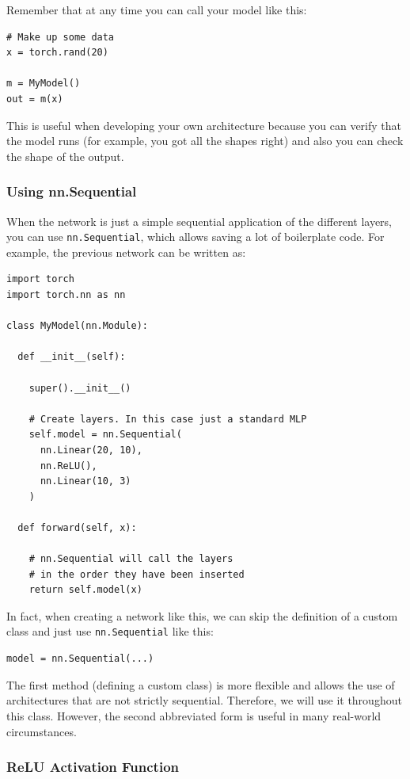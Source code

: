 Remember that at any time you can call your model like this:
\begin{lstlisting}
# Make up some data
x = torch.rand(20)

m = MyModel()
out = m(x)
\end{lstlisting}

This is useful when developing your own architecture because you can verify that the model runs (for example, you got all the shapes right) and also you can check the shape of the output.

\subsubsection{Using nn.Sequential}

When the network is just a simple sequential application of the different layers, you can use \verb|nn.Sequential|, which allows saving a lot of boilerplate code. For example, the previous network can be written as:

\begin{lstlisting}
import torch
import torch.nn as nn

class MyModel(nn.Module):

  def __init__(self):

    super().__init__()

    # Create layers. In this case just a standard MLP
    self.model = nn.Sequential(
      nn.Linear(20, 10),
      nn.ReLU(),
      nn.Linear(10, 3)
    )

  def forward(self, x):

    # nn.Sequential will call the layers 
    # in the order they have been inserted
    return self.model(x)
\end{lstlisting}

In fact, when creating a network like this, we can skip the definition of a custom class and just use \verb|nn.Sequential| like this:

\begin{lstlisting}
model = nn.Sequential(...)
\end{lstlisting}
The first method (defining a custom class) is more flexible and allows the use of architectures that are not strictly sequential. Therefore, we will use it throughout this class. However, the second abbreviated form is useful in many real-world circumstances.

\subsubsection{ReLU Activation Function}

